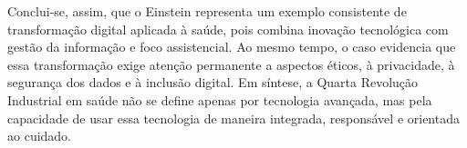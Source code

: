 \documentclass[12pt,a4paper]{article}
\begin{document}
Conclui-se, assim, que o Einstein representa um exemplo consistente de transformação digital aplicada à saúde, pois combina inovação tecnológica com gestão da informação e foco assistencial. Ao mesmo tempo, o caso evidencia que essa transformação exige atenção permanente a aspectos éticos, à privacidade, à segurança dos dados e à inclusão digital. Em síntese, a Quarta Revolução Industrial em saúde não se define apenas por tecnologia avançada, mas pela capacidade de usar essa tecnologia de maneira integrada, responsável e orientada ao cuidado.
\end{document}
